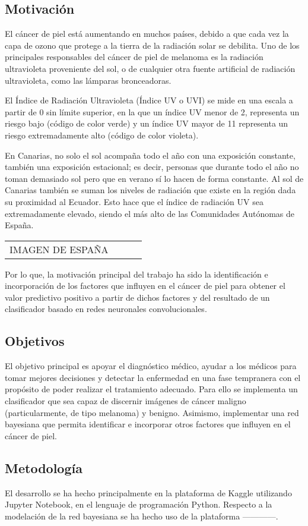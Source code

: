 \pagestyle{fancy}
\fancyhf{}

\subsection{Motivación}
El cáncer de piel está aumentando en muchos países, debido a que cada vez la capa de ozono que protege a la tierra de la radiación solar se debilita. Uno de los principales responsables del cáncer de piel de melanoma es la radiación ultravioleta proveniente del sol, o de cualquier otra fuente artificial de radiación ultravioleta, como las lámparas bronceadoras.

El Índice de Radiación Ultravioleta (Índice UV o UVI) se mide en una escala a partir de 0 sin límite superior, en la que un índice UV menor de 2, representa un riesgo bajo (código de color verde) y un índice UV mayor de 11 representa un riesgo extremadamente alto (código de color violeta).

En Canarias, no solo el sol acompaña todo el año con una exposición constante, también una exposición estacional; es decir, personas que durante todo el año no toman demasiado sol pero que en verano sí lo hacen de forma constante. Al sol de Canarias también se suman los niveles de radiación que existe en la región dada su proximidad al Ecuador. Esto hace que el índice de radiación UV sea extremadamente elevado, siendo el más alto de las Comunidades Autónomas de España.
\newpage

\begin{tabular}{|cl|cl|}
IMAGEN DE ESPAÑA
\end{tabular}

\bigskip
Por lo que, la motivación principal del trabajo ha sido la identificación e incorporación de los factores que influyen en el cáncer de piel para obtener el valor predictivo positivo a partir de dichos factores y del resultado de un clasificador basado en redes neuronales convolucionales.
\newpage

\pagestyle{fancy}
\fancyhf{}
\subsection{Objetivos}
El objetivo principal es apoyar el diagnóstico médico, ayudar a los médicos para tomar mejores decisiones y detectar la enfermedad en una fase tempranera con el propósito de poder realizar el tratamiento adecuado. Para ello se implementa un clasificador que sea capaz de discernir imágenes de cáncer maligno (particularmente, de tipo melanoma) y benigno. Asimismo, implementar una red bayesiana que permita identificar e incorporar otros factores que influyen en el cáncer de piel.

\subsection{Metodología}
El desarrollo se ha hecho principalmente en la plataforma de Kaggle utilizando Jupyter Notebook, en el lenguaje de programación Python. Respecto a la modelación de la red bayesiana se ha hecho uso de la plataforma ------------.